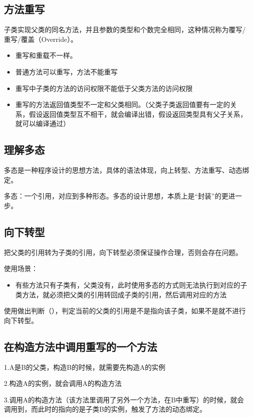 \documentclass[a4paper]{report}
\begin{document}
\subsection{方法重写}
子类实现父类的同名方法，并且参数的类型和个数完全相同，这种情况称为覆写/重写/覆盖（Override）。
\begin{itemize}
\itemsep=0pt \parskip =0pt
\item 重写和重载不一样。
\item 普通方法可以重写，方法不能重写
\item 重写中子类的方法的访问权限不能低于父类方法的访问权限
\item  重写的方法返回值类型不一定和父类相同。（父类子类返回值要有一定的关系，假设返回值类型互不相干，就会编译出错，假设返回类型具有父子关系，就可以编译通过）
\end{itemize}
\subsection{理解多态}
多态是一种程序设计的思想方法，具体的语法体现，向上转型、方法重写、动态绑定。

多态：一个引用，对应到多种形态。多态的设计思想，本质上是“封装”的更进一步。
\subsection{向下转型}

把父类的引用转为子类的引用，向下转型必须保证操作合理，否则会存在问题。

使用场景：
\begin{itemize}
\itemsep=0pt \parskip =0pt
\item 有些方法只有子类有，父类没有，此时使用多态的方式则无法执行到对应的子类方法，就必须把父类的引用转回成子类的引用，然后调用对应的方法
\end{itemize}
使用做出判断（），判定当前的父类的引用是不是指向该子类，如果不是就不进行向下转型。

\subsection{在构造方法中调用重写的一个方法}
1.A是B的父类，构造B的时候，就需要先构造A的实例

2.构造A的实例，就会调用A的构造方法

3.调用A的构造方法（该方法里调用了另外一个方法，在B中重写）的时候，就会调用到，而此时的指向的是子类B的实例，触发了方法的动态绑定。
\end{document}
